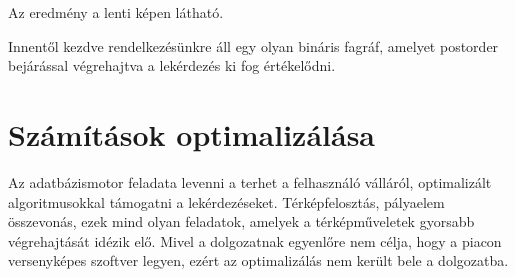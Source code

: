 Az eredmény a lenti képen látható.

Innentől kezdve rendelkezésünkre áll egy olyan bináris fagráf, amelyet postorder bejárással végrehajtva a lekérdezés ki fog értékelődni.


\section{Számítások optimalizálása}

Az adatbázismotor feladata levenni a terhet a felhasználó válláról, 
optimalizált algoritmusokkal támogatni a lekérdezéseket. Térképfelosztás, pályaelem összevonás, ezek mind olyan feladatok,
amelyek a térképműveletek gyorsabb végrehajtását idézik elő.
Mivel a dolgozatnak egyenlőre nem célja, hogy a piacon versenyképes szoftver legyen, ezért az optimalizálás nem került bele a dolgozatba.


